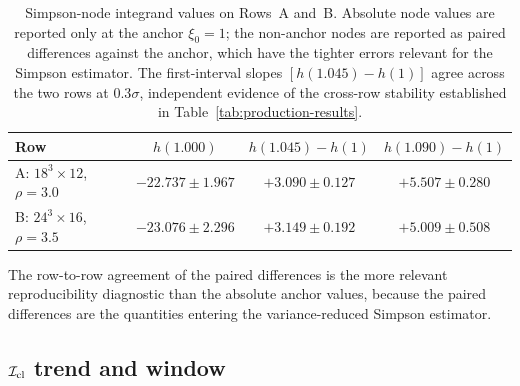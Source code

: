 \documentclass[a4paper,11pt]{article}
\theoremstyle{definition}
\newcommand{\Icl}{\mathcal{I}_{\rm cl}}
\begin{document}
\begin{table}[h]
\centering
\begin{tabular}{lccc}
\toprule
Row & $h(1.000)$ & $h(1.045) - h(1)$ & $h(1.090) - h(1)$ \\
\midrule
A: $18^3\times 12$, $\rho=3.0$
  & $-22.737 \pm 1.967$
  & $+3.090 \pm 0.127$
  & $+5.507 \pm 0.280$ \\
B: $24^3\times 16$, $\rho=3.5$
  & $-23.076 \pm 2.296$
  & $+3.149 \pm 0.192$
  & $+5.009 \pm 0.508$ \\
\bottomrule
\end{tabular}
\caption{Simpson-node integrand values on Rows~A and~B. Absolute
node values are reported only at the anchor $\xi_0 = 1$; the
non-anchor nodes are reported as paired differences against the
anchor, which have the tighter errors relevant for the Simpson
estimator. The first-interval slopes $[h(1.045) - h(1)]$ agree
across the two rows at $0.3\sigma$, independent evidence of the
cross-row stability established in
Table~\ref{tab:production-results}.}
\label{tab:simpson-integrands}
\end{table}

The row-to-row agreement of the paired differences is the more
relevant reproducibility diagnostic than the absolute anchor
values, because the paired differences are the quantities entering
the variance-reduced Simpson estimator.

\subsection{$\Icl$ trend and window}
\label{subsec:icl-correlation}
\end{document}
